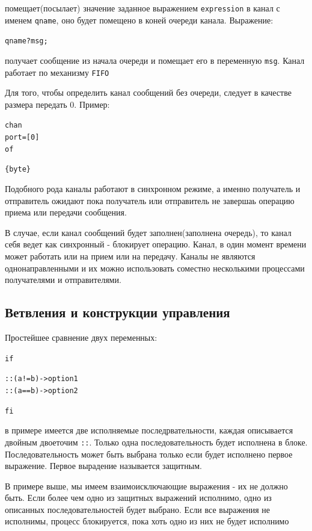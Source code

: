 \documentclass[12pt, twoside]{report}
\newcommand{\cname}[1] {
\textcolor{atnotation}{#1}
}
\begin{document}
помещает(посылает) значение заданное выражением \texttt{expression} в канал с именем
\texttt{qname}, оно будет помещено в коней очереди канала. Выражение:

\begin{alltt}
qname ? msg;
\end{alltt}

получает сообщение из начала очереди и помещает его в переменную \texttt{msg}.
Канал работает по механизму \texttt{FIFO}

Для того, чтобы определить канал сообщений без очереди, следует в качестве размера передать 0.
Пример:

\begin{alltt}
\cname{chan} port = [0] \cname{of} \cname{\{byte\}}
\end{alltt}

Подобного рода каналы работают в синхронном режиме, а именно получатель и отправитель ожидают
пока получатель или отправитель не завершаь операцию приема или передачи сообщения.

В случае, если канал сообщений будет заполнен(заполнена очередь), то канал себя ведет как синхронный
- блокирует операцию. Канал, в один момент времени может работать или на прием или на передачу.
Каналы не являются однонаправленными и их можно использовать соместно несколькими процессами
получателями и отправителями.

\subsection*{Ветвления и конструкции управления}\label{promela_language_IF}

Простейшее сравнение двух переменных:

\begin{alltt}
\cname{if}
:: ( a != b ) -> option1
:: ( a == b ) -> option2
\cname{fi}
\end{alltt}

в примере имеется две исполняемые последрвательности, каждая описывается
двойным двоеточим \texttt{::}. Только одна последовательность будет исполнена
в блоке. Последовательность может быть выбрана только если будет
исполнено первое выражение. Первое вырадение называется защитным.

В примере выше, мы имеем взаимоисключающие выражения - их не должно быть.
Если более чем одно из защитных выражений исполнимо, одно из описанных последовательностей
будет выбрано. Если все выражения не исполнимы, процесс блокируется, пока хоть одно из них не будет исполнимо
\end{document}
